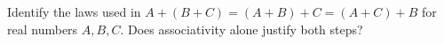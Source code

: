 Identify the laws used in $A+(B+C)=(A+B)+C=(A+C)+B$ for real numbers $A,B,C$. Does associativity alone justify both steps?
